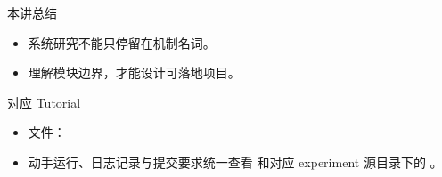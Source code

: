 \begin{frame}{本讲总结}
  \begin{itemize}
    \item 系统研究不能只停留在机制名词。
    \item 理解模块边界，才能设计可落地项目。
  \end{itemize}
\end{frame}

\begin{frame}{对应 Tutorial}
  \begin{itemize}
    \item 文件：\texttt{}
    \item 动手运行、日志记录与提交要求统一查看 \texttt{} 和对应 experiment 源目录下的 \texttt{}。
  \end{itemize}
\end{frame}

